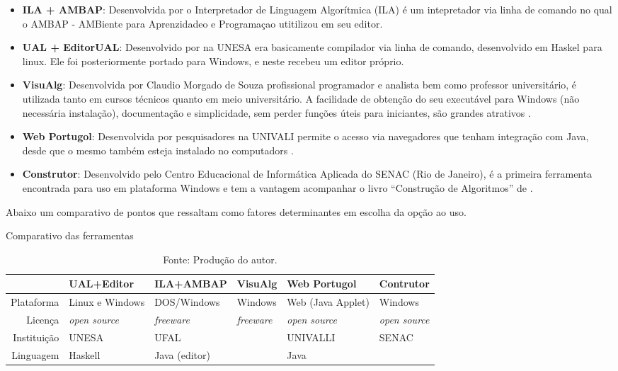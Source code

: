 \begin{itemize}

\item \textbf{ILA + AMBAP}: Desenvolvida por  o Interpretador de Linguagem Algorítmica (ILA) é um intepretador via linha de comando no qual o AMBAP - AMBiente para Aprenzidadeo e Programaçao utitilizou em seu editor.

\item \textbf{UAL + EditorUAL}: Desenvolvido por  na UNESA era basicamente compilador via linha de comando, desenvolvido em Haskel para linux. Ele foi posteriormente portado para Windows, e neste recebeu um editor próprio.

\item \textbf{VisuAlg}: Desenvolvida por Claudio Morgado de Souza profissional programador e analista bem como professor universitário, é utilizada tanto em cursos técnicos quanto em meio universitário. A facilidade de obtenção do seu executável para Windows (não necessária instalação), documentação e simplicidade, sem perder funções úteis para iniciantes, são grandes atrativos \cite{souza2013etal}.

\item \textbf{Web Portugol}: Desenvolvida por pesquisadores na UNIVALI permite o acesso via navegadores que tenham integração com Java, desde que o mesmo também esteja instalado no computadors \cite{souza2013etal}.

\item \textbf{Construtor}: Desenvolvido pelo Centro Educacional de Informática Aplicada do SENAC (Rio de Janeiro), é a primeira ferramenta encontrada para uso em plataforma Windows e tem a vantagem acompanhar o livro ``Construção de Algoritmos'' de .

\end{itemize}

Abaixo um comparativo de pontos que ressaltam como fatores determinantes em escolha da opção ao uso.

\begin{table}[h]
\centering
  \caption{Comparativo das ferramentas}\label{qua:compare-tools}
\begin{tabular}{ r | l | l | l | l | l }\hline
& UAL+Editor & ILA+AMBAP & VisuAlg & Web Portugol & Contrutor \\ \hline
Plataforma & Linux e Windows & DOS/Windows & Windows & Web (Java Applet) & Windows \\ \hline
Licença & \textit{open source} & \textit{freeware} & \textit{freeware} & \textit{open source} & \textit{open source} \\ \hline
Instituição & UNESA & UFAL &  & UNIVALLI & SENAC \\ \hline
Linguagem & Haskell & Java (editor) &  & Java & \\ \hline
\end{tabular}
  \caption*{\ifdraft{\color{green}}{}\footnotesize Fonte: Produção do autor.}
\end{table}

